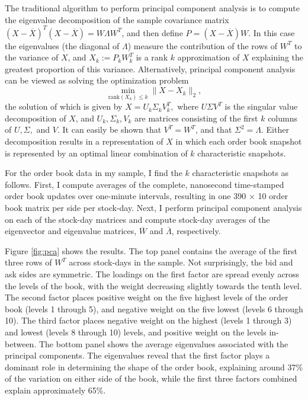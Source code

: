	The traditional algorithm to perform principal component analysis is to compute the eigenvalue decomposition of the sample covariance matrix $(X - \overline{X})^T(X - \overline{X}) = W \Lambda W^T$, and then define $P = (X - \overline{X})W$. In this case the eigenvalues (the diagonal of $\Lambda$) measure the contribution of the rows of $W^T$ to the variance of $X$, and $X_k := P_k W_k^T$ is a rank $k$ approximation of $X$ explaining the greatest proportion of this variance. Alternatively, principal component analysis can be viewed as solving the optimization problem $$ \min_{\text{rank}(X_k) \le k} \| X - X_k \|_2,$$ the solution of which is given by $X = U_k \Sigma_k V_k^T, $ where $U \Sigma V^T$ is the singular value decomposition of $X$, and $U_k, \Sigma_k, V_k$ are matrices consisting of the first $k$ columns of $U, \Sigma,$ and $V$. It can easily be shown that $V^T = W^T$, and that $\Sigma^2 = \Lambda$. Either decomposition results in a representation of $X$ in which each order book snapshot is represented by an optimal linear combination of $k$ characteristic snapshots.

	For the order book data in my sample, I find the $k$ characteristic snapshots as follows. First, I compute averages of the complete, nanosecond time-stamped order book updates over one-minute intervals, resulting in one 390 $\times$ 10 order book matrix per side per stock-day. Next, I perform principal component analysis on each of the stock-day matrices and compute stock-day averages of the eigenvector and eigenvalue matrices, $\overline{W}$ and $\overline{\Lambda}$, respectively.

	Figure \ref{fig:pca} shows the results. The top panel contains the average of the first three rows of $W^T$ across stock-days in the sample. Not surprisingly, the bid and ask sides are symmetric. The loadings on the first factor are spread evenly across the levels of the book, with the weight decreasing slightly towards the tenth level. The second factor places positive weight on the five highest levels of the order book (levels 1 through 5), and negative weight on the five lowest (levels 6 through 10). The third factor places negative weight on the highest (levels 1 through 3) and lowest (levels 8 through 10) levels, and positive weight on the levels in-between. The bottom panel shows the average eigenvalues associated with the principal components. The eigenvalues reveal that the first factor plays a dominant role in determining the shape of the order book, explaining around 37\% of the variation on either side of the book, while the first three factors combined explain approximately 65\%.

